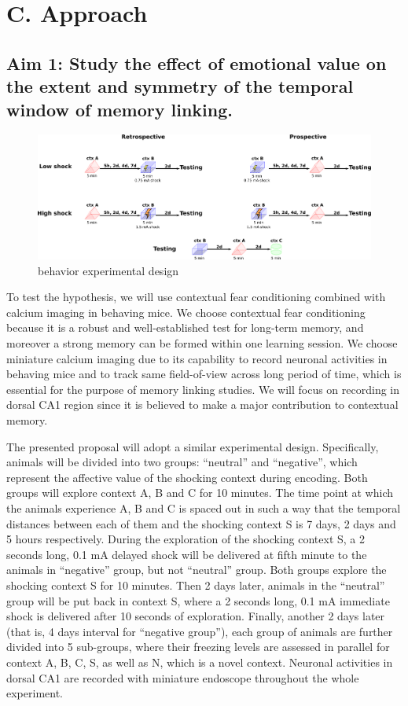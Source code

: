 \documentclass[master.tex]{subfiles}
\begin{document}
\section*{C. Approach}

\subsection*{Aim 1: Study the effect of emotional value on the extent and symmetry
  of the temporal window of memory linking.}

\begin{figure}[!b]
\centering
\includegraphics[scale = .135]{Figures/full.pdf}
\caption{\footnotesize behavior experimental design}
\label{fig1}
\end{figure}

To test the hypothesis, we will use contextual fear conditioning combined with
calcium imaging in behaving mice. We choose contextual fear conditioning because
it is a robust and well-established test for long-term memory, and moreover a
strong memory can be formed within one learning session. We choose miniature
calcium imaging due to its capability to record neuronal activities in behaving
mice and to track same field-of-view across long period of time, which is
essential for the purpose of memory linking studies. We will focus on recording
in dorsal CA1 region since it is believed to make a major contribution to
contextual memory.

The presented proposal will adopt a similar experimental design. Specifically,
animals will be divided into two groups: ``neutral'' and ``negative'', which
represent the affective value of the shocking context during encoding. Both
groups will explore context A, B and C for 10 minutes. The time point at which
the animals experience A, B and C is spaced out in such a way that the temporal
distances between each of them and the shocking context S is 7 days, 2 days and
5 hours respectively. During the exploration of the shocking context S, a 2
seconds long, 0.1 mA delayed shock will be delivered at fifth minute to the
animals in ``negative'' group, but not ``neutral'' group. Both groups explore
the shocking context S for 10 minutes. Then 2 days later, animals in the
``neutral'' group will be put back in context S, where a 2 seconds long, 0.1 mA
immediate shock is delivered after 10 seconds of exploration. Finally, another 2
days later (that is, 4 days interval for ``negative group''), each group of
animals are further divided into 5 sub-groups, where their freezing levels are
assessed in parallel for context A, B, C, S, as well as N, which is a novel
context. Neuronal activities in dorsal CA1 are recorded with miniature
endoscope throughout the whole experiment.
\end{document}
